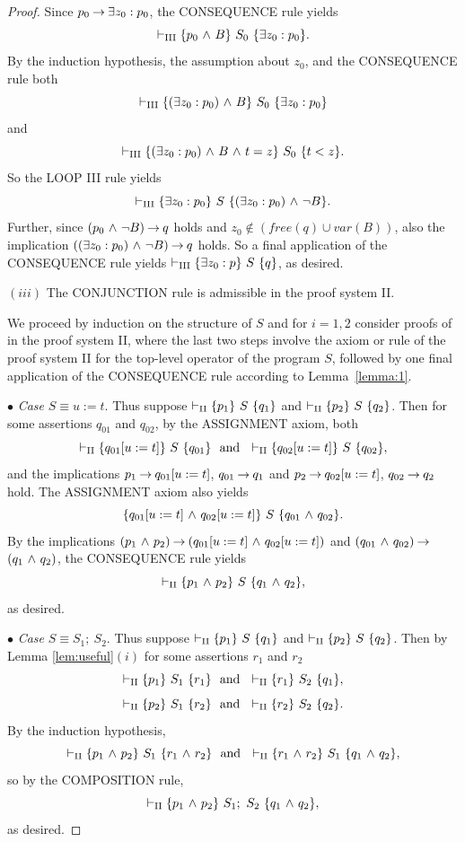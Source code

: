 \documentclass[manuscript, screen, review]{acmart}
\begin{document}
\begin{proof}
Since $p_0 \mbox{$\:\rightarrow\:$} \mbox{$\exists$} z_0: p_0$, the CONSEQUENCE rule yields
\[
 \vdash_{\rm{III}} \mbox{$\{{p_{0} \mbox{$\ \wedge\ $} B}\}\ {S_0}\ \{{\mbox{$\exists$} z_0: p_{0}}\}$}.
\]
By the induction hypothesis, the assumption about $z_0$,
and the CONSEQUENCE rule both
\[
 \vdash_{\rm{III}} \mbox{$\{{(\mbox{$\exists$} z_0:p_0) \mbox{$\ \wedge\ $} B}\}\ {S_0}\ \{{\mbox{$\exists$} z_0: p_{0}}\}$}
\]
and
\[
 \vdash_{\rm{III}} \mbox{$\{{(\mbox{$\exists$} z_0:p_0) \mbox{$\ \wedge\ $} B \mbox{$\ \wedge\ $} t = z}\}\ {S_0}\ \{{t < z}\}$}.
\]
So the LOOP III rule yields 
\[
 \vdash_{\rm{III}} \mbox{$\{{\mbox{$\exists$} z_0:p_0}\}\ {S}\ \{{(\mbox{$\exists$} z_0:p_0) \mbox{$\ \wedge\ $} \neg B}\}$}.
\]
Further, since $(p_{0} \mbox{$\ \wedge\ $} \neg B) \mbox{$\:\rightarrow\:$} q$ holds and
$z_0 \not\in (\mathit{free(q)} \cup var(B))$, also the implication
$((\mbox{$\exists$} z_0:p_0) \mbox{$\ \wedge\ $} \neg B) \mbox{$\:\rightarrow\:$} q$ holds.  So a final application of the
CONSEQUENCE rule yields $\vdash_{\rm{III}} \mbox{$\{{\mbox{$\exists$} z_0:p}\}\ {S}\ \{{q}\}$}$, as
desired.

\III

\NI
$(iii)$ The {\rm CONJUNCTION} rule is admissible in the proof system {\rm II}.

We proceed by induction on the structure of $S$
and for $i=1,2$ consider proofs of  in the proof system \rm{II}, where 
the last two steps involve the axiom or rule of the proof system \rm{II} 
for the top-level operator of the program $S$, 
followed by one final application of the CONSEQUENCE rule
according to Lemma~\ref{lemma:1}.

\III

\NI
$\bullet$ \emph{Case} $S \equiv u:=t$.
Thus suppose $\vdash_{\rm{II}} \mbox{$\{{p_1}\}\ {S}\ \{{q_1}\}$}$ and
$\vdash_{\rm{II}} \mbox{$\{{p_2}\}\ {S}\ \{{q_2}\}$}$.
Then for some assertions $q_{01}$ and $q_{02}$,
by the ASSIGNMENT axiom, both
\[
 \vdash_{\rm{II}} \HT{q_{01}[u:=t]}{S}{q_{01}} \ \mbox{ and }\
 \vdash_{\rm{II}} \HT{q_{02}[u:=t]}{S}{q_{02}},
\]
and the implications 
$p_1 \mbox{$\:\rightarrow\:$} q_{01}[u:=t]$, $q_{01} \mbox{$\:\rightarrow\:$} q_1$ and
$p_2 \mbox{$\:\rightarrow\:$} q_{02}[u:=t]$, $q_{02} \mbox{$\:\rightarrow\:$} q_2$ hold.
The ASSIGNMENT axiom also yields
\[
 \mbox{$\{{q_{01}[u:=t] \mbox{$\ \wedge\ $} q_{02}[u:=t]}\}\ {S}\ \{{q_{01} \mbox{$\ \wedge\ $} q_{02}}\}$}.
\]
By the implications 
$(p_1 \mbox{$\ \wedge\ $} p_2) \mbox{$\:\rightarrow\:$} (q_{01}[u:=t] \mbox{$\ \wedge\ $} q_{02}[u:=t])$ and 
$(q_{01} \mbox{$\ \wedge\ $} q_{02}) \mbox{$\:\rightarrow\:$}$ $(q_1 \mbox{$\ \wedge\ $} q_2)$,
the CONSEQUENCE rule yields
\[
  \vdash_{\rm{II}} \mbox{$\{{p_1 \mbox{$\ \wedge\ $} p_2}\}\ {S}\ \{{q_1 \mbox{$\ \wedge\ $} q_2}\}$},
\]
as desired.

\III

\NI
$\bullet$ \emph{Case} $S \equiv S_1 ;\ S_2$.
Thus suppose $\vdash_{\rm{II}} \mbox{$\{{p_1}\}\ {S}\ \{{q_1}\}$}$ and
$\vdash_{\rm{II}} \mbox{$\{{p_2}\}\ {S}\ \{{q_2}\}$}$.
Then by Lemma \ref{lem:useful}$(i)$ for some assertions $r_1$ and $r_2$
\[
 \vdash_{\rm{II}} \HT{p_{1}}{S_1}{r_1} \ \mbox{ and }\ 
 \vdash_{\rm{II}} \HT{r_1}{S_2}{q_{1}},
\]
\[
 \vdash_{\rm{II}} \mbox{$\{{p_{2}}\}\ {S_1}\ \{{r_2}\}$} \ \mbox{ and }\
 \vdash_{\rm{II}} \mbox{$\{{r_2}\}\ {S_2}\ \{{q_{2}}\}$}.
\]
By the induction hypothesis,
\[
 \vdash_{\rm{II}} \mbox{$\{{p_1 \mbox{$\ \wedge\ $} p_2}\}\ {S_1}\ \{{r_1 \mbox{$\ \wedge\ $} r_2}\}$} \ \mbox{ and }\
 \vdash_{\rm{II}} \mbox{$\{{r_1 \mbox{$\ \wedge\ $} r_2}\}\ {S_1}\ \{{q_1 \mbox{$\ \wedge\ $} q_2}\}$},
\]
so by the COMPOSITION rule,
\[
  \vdash_{\rm{II}} \mbox{$\{{p_1 \mbox{$\ \wedge\ $} p_2}\}\ {S_1;\ S_2}\ \{{q_1 \mbox{$\ \wedge\ $} q_2}\}$},
\]
as desired.


\end{proof}
\end{document}
